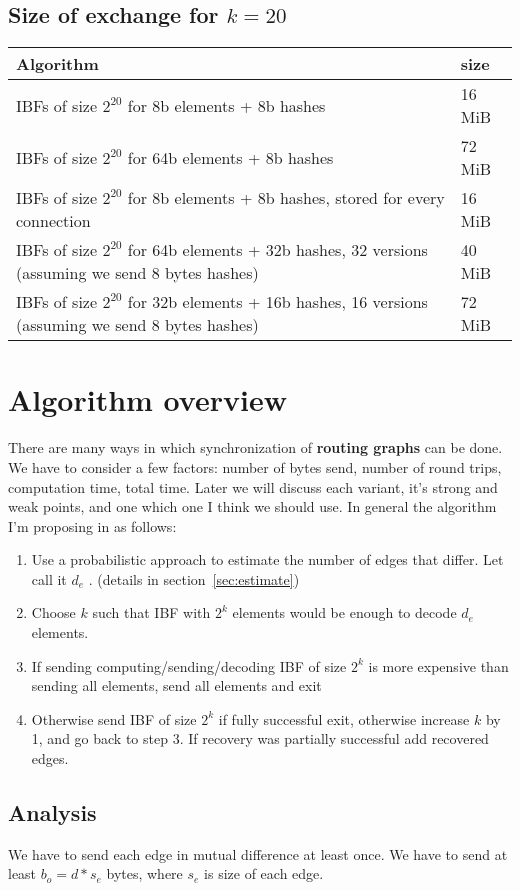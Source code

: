 \documentclass[11pt]{article}
\begin{document}
\subsection{Size of exchange for $k = 20$}
\begin{tabular}{ | l | l | }
    \hline
    Algorithm & size \\ \hline
    IBFs of size $2^{20}$ for 8b elements + 8b hashes & 16 MiB \\
    IBFs of size $2^{20}$  for 64b elements + 8b hashes & 72 MiB \\
    IBFs of size $2^{20}$  for 8b elements + 8b hashes, stored for every connection & 16 MiB  \\
    IBFs of size $2^{20}$  for 64b elements + 32b hashes, 32 versions (assuming we send 8 bytes hashes) & 40 MiB  \\
    IBFs of size $2^{20}$  for 32b elements + 16b hashes, 16 versions (assuming we send 8 bytes hashes) & 72 MiB  \\ \hline
\end{tabular}

\section{Algorithm overview}
There are many ways in which synchronization of \textbf{routing graphs} can be done.
We have to consider a few factors: number of bytes send, number of round trips, computation time, total time.
Later we will discuss each variant, it's strong and weak points, and one which one I think we should use.
In general the algorithm I'm proposing in as follows:
\begin{enumerate}
  \item Use a probabilistic approach to estimate the number of edges that differ.
  Let call it $d_e$ . (details in section~\ref{sec:estimate})
  \item Choose $k$ such that IBF with $2^k$ elements would be enough to decode $d_e$ elements.
  \item If sending computing/sending/decoding IBF of size $2^k$ is more expensive than sending all elements, send all elements and exit
  \item Otherwise send IBF of size $2^k$ if fully successful exit, otherwise increase $k$ by 1, and go back to step 3.
 If recovery was partially successful add recovered edges.
\end{enumerate}
\subsection{Analysis}
We have to send each edge in mutual difference at least once.
We have to send at least $b_o = d*s_e$ bytes, where $s_e$ is size of each edge.
\end{document}
